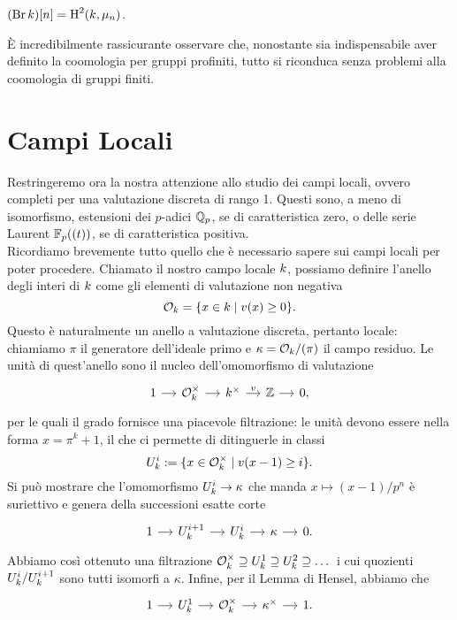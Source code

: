 \begin{lemma}
	$ (\operatorname{Br} k) [n] = \operatorname{H}^2(k, \mu_n) $.
\end{lemma}

\begin{profinite}
	È incredibilmente rassicurante osservare che, nonostante sia indispensabile aver definito la coomologia per gruppi profiniti, tutto si riconduca senza problemi alla coomologia di gruppi finiti.
\end{profinite}

\section{Campi Locali}
Restringeremo ora la nostra attenzione allo studio dei campi locali, ovvero completi per una valutazione discreta di rango 1. Questi sono, a meno di isomorfismo, estensioni dei $ p $-adici $ \mathbb{Q}_p $, se di caratteristica zero, o delle serie Laurent $ \mathbb{F}_p((t)) $, se di caratteristica positiva. \\

Ricordiamo brevemente tutto quello che è necessario sapere sui campi locali per poter procedere. Chiamato il nostro campo locale $ k $, possiamo definire l'anello degli interi di $ k $ come gli elementi di valutazione non negativa
\[ \mathcal{O}_{k} = \{ x \in k \mid v(x)\geq 0 \}. \]
Questo è naturalmente un anello a valutazione discreta, pertanto locale: chiamiamo $ \pi $ il generatore dell'ideale primo e $ \kappa = \mathcal{O}_{k}/(\pi) $ il campo residuo. Le unità di quest'anello sono il nucleo dell'omomorfismo di valutazione
\begin{equation}\label{local1}
	\begin{tikzcd}[column sep = small]
	1 \rar
	& \mathcal{O}_{\K}^\times \rar
	& \K^\times \rar["v"]
	& \Z \rar
	& 0,
	\end{tikzcd}
\end{equation}
per le quali il grado fornisce una piacevole filtrazione: le unità devono essere nella forma $ x = \pi^k +1 $, il che ci permette di ditinguerle in classi  $$  U_{k}^i :=\{x \in \mathcal{O}_{k}^\times \mid v(x-1) \geq i \}.  $$ Si può mostrare che l'omomorfismo $ U_{k}^i \to \kappa $ che manda $ x \mapsto (x-1)/p^n $ è suriettivo e genera della successioni esatte corte
\begin{equation}\label{local2}
\begin{tikzcd}[column sep = small]
1 \rar
& U_k^{i+1} \rar
& U_{\K}^i \rar
& \kappa \rar
& 0.
\end{tikzcd}
\end{equation}
Abbiamo così ottenuto una filtrazione $ \mathcal{O}_{k}^\times \supseteq U_{k}^1 \supseteq U_{k}^2 \supseteq \dots $ 
i cui quozienti $ U_{k}^i / U_{k}^{i+1} $ sono tutti isomorfi a $ \kappa $.
Infine, per il Lemma di Hensel, abbiamo che
\begin{equation}\label{local3}
	\begin{tikzcd}[column sep = small]
	1 \rar
	& U_k^{1} \rar
	& \mathcal{O}_{\K}^\times \rar
	& \kappa^\times \rar
	&1.
	\end{tikzcd}
\end{equation}

